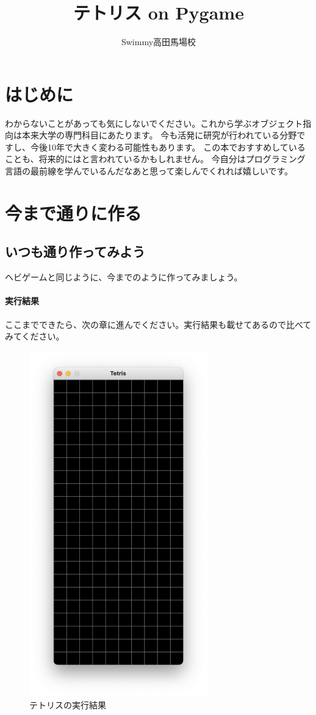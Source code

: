 \documentclass[12pt, a4paper, dvipdfmx]{book}
\title{テトリス on Pygame}
\author{Swimmy高田馬場校}
\begin{document}
\maketitle
\tableofcontents
\chapter{はじめに}
わからないことがあっても気にしないでください。これから学ぶオブジェクト指向は本来大学の専門科目にあたります。
今も活発に研究が行われている分野ですし、今後10年で大きく変わる可能性もあります。
この本でおすすめしていることも、将来的にはと言われているかもしれません。
今自分はプログラミング言語の最前線を学んでいるんだなあと思って楽しんでくれれば嬉しいです。

\chapter{今まで通りに作る}
\section{いつも通り作ってみよう}
ヘビゲームと同じように、今までのように作ってみましょう。

\newpage
\subsubsection{実行結果}
ここまでできたら、次の章に進んでください。実行結果も載せてあるので比べてみてください。
\begin{figure}[h]
  \centering
  \includegraphics[height=15cm, natwidth=824,natheight=1600]{TetrisCH1_1.png}
  \caption{テトリスの実行結果}
\end{figure}
\end{document}
